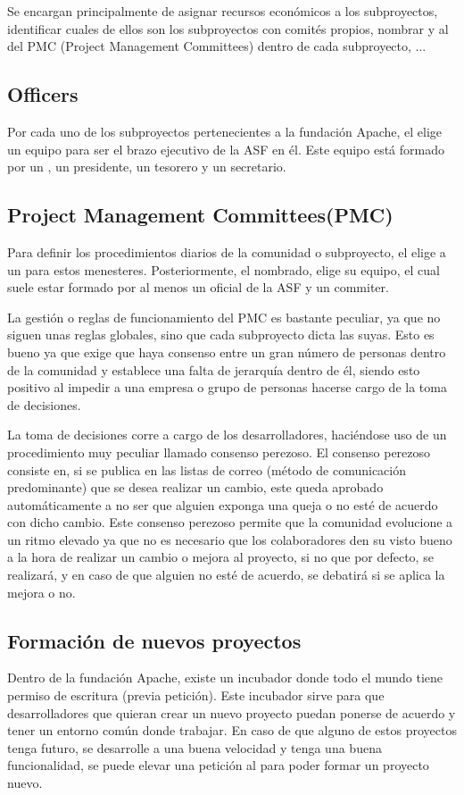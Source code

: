 Se encargan principalmente de asignar recursos econ\'omicos a los subproyectos, identificar cuales de ellos son los subproyectos con comit\'es propios, nombrar  y al  del PMC (Project Management Committees) dentro de cada subproyecto, ...

\subsection{Officers}
Por cada uno de los subproyectos pertenecientes a la fundaci\'on Apache, el  elige un equipo para ser el brazo ejecutivo de la ASF en \'el. Este equipo est\'a formado por un , un presidente, un tesorero y un secretario.

\subsection{Project Management Committees(PMC)}
Para definir los procedimientos diarios de la comunidad o subproyecto, el  elige a un  para estos menesteres. Posteriormente, el  nombrado, elige su equipo, el cual suele estar formado por al menos un oficial de la ASF y un commiter.

La gesti\'on o reglas de funcionamiento del PMC es bastante peculiar, ya que no siguen unas reglas globales, sino que cada subproyecto dicta las suyas. Esto es bueno ya que exige que haya consenso entre un gran n\'umero de personas dentro de la comunidad y establece una falta de jerarqu\'ia dentro de \'el, siendo esto positivo al impedir a una empresa o grupo de personas hacerse cargo de la toma de decisiones.

La toma de decisiones corre a cargo de los desarrolladores, haci\'endose uso de un procedimiento muy peculiar llamado consenso perezoso. El consenso perezoso consiste en, si se publica en las listas de correo (m\'etodo de comunicaci\'on predominante) que se desea realizar un cambio, este queda aprobado autom\'aticamente a no ser que alguien exponga una queja o no est\'e de acuerdo con dicho cambio. Este consenso perezoso permite que la comunidad evolucione a un ritmo elevado ya que no es necesario que los colaboradores den su visto bueno a la hora de realizar un cambio o mejora al proyecto, si no que por defecto, se realizar\'a, y en caso de que alguien no est\'e de acuerdo, se debatir\'a si se aplica la mejora o no.

\subsection{Formaci\'on de nuevos proyectos}
Dentro de la fundaci\'on Apache, existe un incubador donde todo el mundo tiene permiso de escritura (previa petici\'on). Este incubador sirve para que desarrolladores que quieran crear un nuevo proyecto puedan ponerse de acuerdo y tener un entorno com\'un donde trabajar. En caso de que alguno de estos proyectos tenga futuro, se desarrolle a una buena velocidad y tenga una buena funcionalidad, se puede elevar una petici\'on al  para poder formar un proyecto nuevo.

